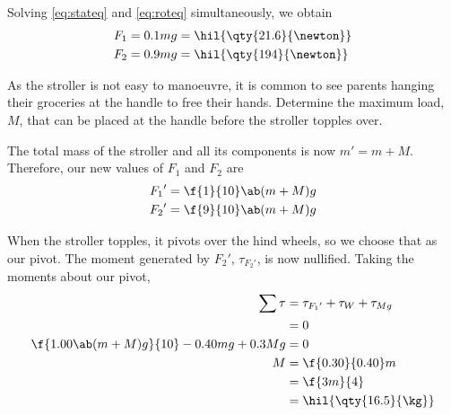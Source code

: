 Solving \cref{eq:stateq} and \cref{eq:roteq} simultaneously, we obtain
\begin{align*}
	F_1 & = 0.1mg = \hil{\qty{21.6}{\newton}} \\
	F_2 & = 0.9mg = \hil{\qty{194}{\newton}}
\end{align*}

\begin{problem}
As the stroller is not easy to manoeuvre, it is common to see parents
hanging their groceries at the handle to free their hands.
Determine the maximum load, \(M\), that can be placed at the handle
before the stroller topples over.
\end{problem}

The total mass of the stroller and all its components is now \(m' = m + M\).
Therefore, our new values of \(F_1\) and \(F_2\) are
\begin{align*}
	{F_1}' & = \f{1}{10}\ab(m+M)g \\
	{F_2}' & = \f{9}{10}\ab(m+M)g
\end{align*}

When the stroller topples, it pivots over the hind wheels, so we
choose that as our pivot.
The moment generated by \({F_2}'\), \(\tau_{{F_2}'}\), is now nullified.
Taking the moments about our pivot,
\begin{align*}
	\sum\tau & = \tau_{{F_1}'} + \tau_{W} + \tau_{Mg} \\
	         & = 0                                    \\
	\f{1.00\ab(m+M)g}{10} - 0.40mg + 0.3Mg
	         & = 0                                    \\
	M        & =\f{0.30}{0.40}m                       \\
	         & =\f{3m}{4}                             \\
	         & = \hil{\qty{16.5}{\kg}}
\end{align*}

